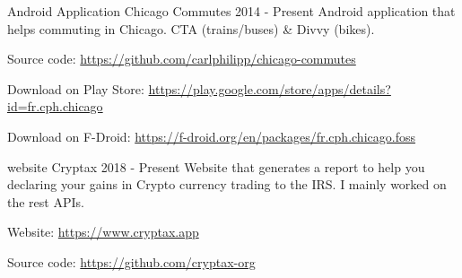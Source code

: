 

\begin{cventries}

  \projectentry
    {Android Application} %
    {Chicago Commutes} %
    {2014 - Present} %
    {Android application that helps commuting in Chicago. CTA (trains/buses) \& Divvy (bikes).\linebreak
{}
    }
    {
    \begin{projectdetails}
        	\item Source code: \href{https://github.com/carlphilipp/chicago-commutes}{https://github.com/carlphilipp/chicago-commutes}
		\item Download on Play Store: \href{https://play.google.com/store/apps/details?id=fr.cph.chicago}{https://play.google.com/store/apps/details?id=fr.cph.chicago}
		\item Download on F-Droid: \href{https://f-droid.org/en/packages/fr.cph.chicago.foss}{https://f-droid.org/en/packages/fr.cph.chicago.foss}
      \end{projectdetails}
   }

  \vspace{-2.0mm}
  \projectentry
    {website} %
    {Cryptax} %
    {2018 - Present} %
    {Website that generates a report to help you declaring your gains in Crypto currency trading to the IRS. I mainly worked on the rest APIs.\linebreak
    }
    {
    \begin{projectdetails}
        	\item Website: \href{https://www.cryptax.app}{https://www.cryptax.app}
		\item Source code: \href{https://github.com/cryptax-org}{https://github.com/cryptax-org}
      \end{projectdetails}
    }


\end{cventries}
